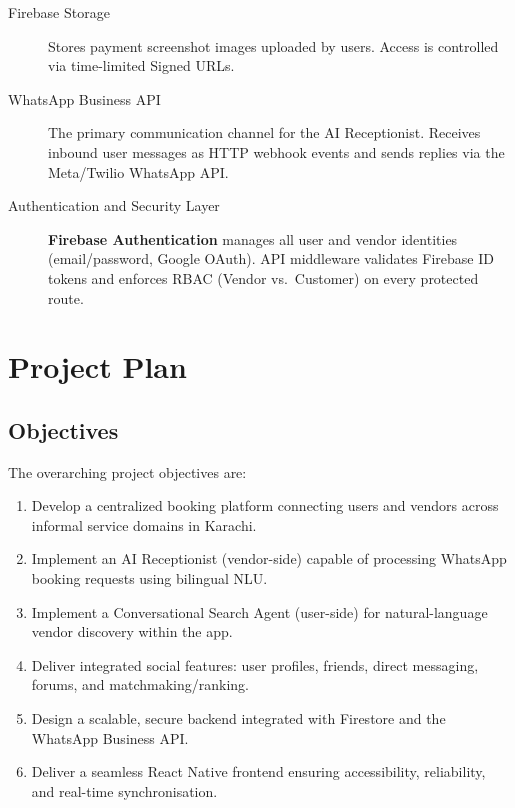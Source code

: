 \begin{description}
  \item[Firebase Storage]
        Stores payment screenshot images uploaded by users.  Access is controlled
        via time-limited Signed URLs.

  \item[WhatsApp Business API]
        The primary communication channel for the AI Receptionist.  Receives inbound
        user messages as HTTP webhook events and sends replies via the Meta/Twilio
        WhatsApp API.

  \item[Authentication and Security Layer]
        \textbf{Firebase Authentication} manages all user and vendor identities
        (email/password, Google OAuth).  API middleware validates Firebase ID tokens
        and enforces RBAC (Vendor vs.\ Customer) on every protected route.
\end{description}

\section{Project Plan}
\label{sec:srs-plan}

\subsection{Objectives}
The overarching project objectives are:
\begin{enumerate}
  \item Develop a centralized booking platform connecting users and vendors across
        informal service domains in Karachi.
  \item Implement an AI Receptionist (vendor-side) capable of processing WhatsApp
        booking requests using bilingual NLU.
  \item Implement a Conversational Search Agent (user-side) for natural-language
        vendor discovery within the app.
  \item Deliver integrated social features: user profiles, friends, direct messaging,
        forums, and matchmaking/ranking.
  \item Design a scalable, secure backend integrated with Firestore and the WhatsApp
        Business API.
  \item Deliver a seamless React Native frontend ensuring accessibility, reliability,
        and real-time synchronisation.
\end{enumerate}

